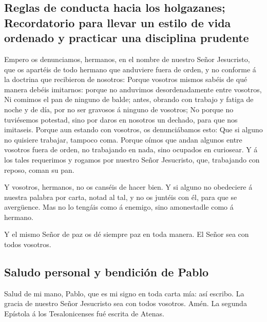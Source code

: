 \hypertarget{reglas-de-conducta-hacia-los-holgazanes-recordatorio-para-llevar-un-estilo-de-vida-ordenado-y-practicar-una-disciplina-prudente}{%
\subsection{Reglas de conducta hacia los holgazanes; Recordatorio para
llevar un estilo de vida ordenado y practicar una disciplina
prudente}\label{reglas-de-conducta-hacia-los-holgazanes-recordatorio-para-llevar-un-estilo-de-vida-ordenado-y-practicar-una-disciplina-prudente}}

 Empero os denunciamos, hermanos, en el nombre de nuestro
Señor Jesucristo, que os apartéis de todo hermano que anduviere fuera de
orden, y no conforme á la doctrina que recibieron de nosotros:
 Porque vosotros mismos sabéis de qué manera debéis
imitarnos: porque no anduvimos desordenadamente entre vosotros,
 Ni comimos el pan de ninguno de balde; antes, obrando con
trabajo y fatiga de noche y de día, por no ser gravosos á ninguno de
vosotros;  No porque no tuviésemos potestad, sino por
daros en nosotros un dechado, para que nos imitaseis. 
Porque aun estando con vosotros, os denunciábamos esto: Que si alguno no
quisiere trabajar, tampoco coma.  Porque oímos que andan
algunos entre vosotros fuera de orden, no trabajando en nada, sino
ocupados en curiosear.  Y á los tales requerimos y
rogamos por nuestro Señor Jesucristo, que, trabajando con reposo, coman
su pan.

 Y vosotros, hermanos, no os canséis de hacer bien.
 Y si alguno no obedeciere á nuestra palabra por carta,
notad al tal, y no os juntéis con él, para que se avergüence.
 Mas no lo tengáis como á enemigo, sino amonestadle como
á hermano.

 Y el mismo Señor de paz os dé siempre paz en toda
manera. El Señor sea con todos vosotros.

\hypertarget{saludo-personal-y-bendiciuxf3n-de-pablo}{%
\subsection{Saludo personal y bendición de
Pablo}\label{saludo-personal-y-bendiciuxf3n-de-pablo}}

 Salud de mi mano, Pablo, que es mi signo en toda carta
mía: así escribo.  La gracia de nuestro Señor Jesucristo
sea con todos vosotros. Amén. La segunda Epístola á los Tesalonicenses
fué escrita de Atenas.

